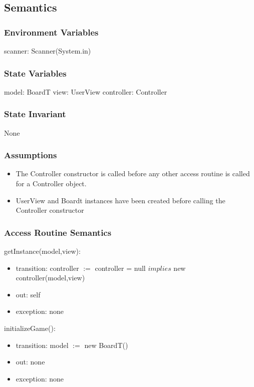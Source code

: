 \documentclass[12pt]{article}
\begin{document}
\subsection* {Semantics}
\subsubsection* {Environment Variables}
scanner: Scanner(System.in)
\subsubsection* {State Variables}

model: BoardT
view: UserView
controller: Controller

\subsubsection* {State Invariant}

None

\subsubsection* {Assumptions}

\begin{itemize}
    \item The Controller constructor is called before any other access routine is called for a Controller object.
    \item UserView and Boardt instances have been created before calling the Controller constructor
\end{itemize}

\subsubsection* {Access Routine Semantics}
getInstance(model,view): 
\begin{itemize}
    \item transition: controller $:=$ controller = null $implies$ new controller(model,view)
    \item out: self
    \item exception: none
\end{itemize}

\noindent initializeGame(): 
\begin{itemize}
    \item transition: model $:=$ new BoardT()
    \item out: none
    \item exception: none
\end{itemize}
\end{document}
